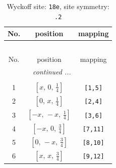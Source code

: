 \documentclass[fleqn,8pt]{jsarticle}
\begin{document}
\renewcommand{\arraystretch}{1.2}
\begin{longtable}{ccc}
\caption{Wyckoff site: {\tt 18e}, site symmetry: {\tt .2}}
 \\
 \hline \hline
No. & position & mapping \\ \hline \endfirsthead

\multicolumn{2}{l}{\tablename\ \thetable{}} \\
 \hline \hline
No. & position & mapping \\ \hline \endhead

 \hline \hline
\multicolumn{2}{r}{\footnotesize\it continued ...} \\ \endfoot

 \hline \hline
\multicolumn{2}{r}{} \\ \endlastfoot

1 & $\left[ x,\, 0,\, \frac{1}{4} \right]$ & {\tt [1,5]} \\ \hline
2 & $\left[ 0,\, x,\, \frac{1}{4} \right]$ & {\tt [2,4]} \\ \hline
3 & $\left[ - x,\, - x,\, \frac{1}{4} \right]$ & {\tt [3,6]} \\ \hline
4 & $\left[ - x,\, 0,\, \frac{3}{4} \right]$ & {\tt [7,11]} \\ \hline
5 & $\left[ 0,\, - x,\, \frac{3}{4} \right]$ & {\tt [8,10]} \\ \hline
6 & $\left[ x,\, x,\, \frac{3}{4} \right]$ & {\tt [9,12]} \\
\end{longtable}
\renewcommand{\arraystretch}{1.2}
\end{document}

